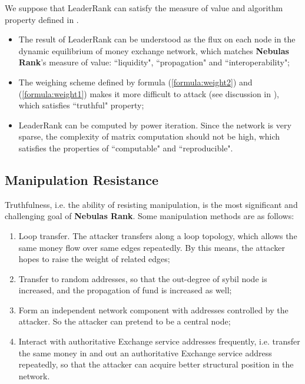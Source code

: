 We suppose that LeaderRank can satisfy the measure of value and algorithm property defined in .
\begin{itemize}
	\item The result of LeaderRank can be understood as the flux on each node in the dynamic equilibrium of money exchange network, which matches \textbf{Nebulas Rank}'s measure of value: ``liquidity", ``propagation" and ``interoperability";
	\item The weighing scheme defined by formula (\ref{formula:weight2}) and (\ref{formula:weight1}) makes it more difficult to attack (see discussion in ), which satisfies ``truthful" property;
	\item LeaderRank can be computed by power iteration. Since the network is very sparse, the complexity of matrix computation should not be high, which satisfies the properties of ``computable" and ``reproducible".
\end{itemize}


\subsection{Manipulation Resistance}\label{subsec:robust}
Truthfulness, i.e. the ability of resisting manipulation, is the most significant and challenging goal of \textbf{Nebulas Rank}. Some manipulation methods are as follows:
\begin{enumerate}
	\item Loop transfer. The attacker transfers along a loop topology, which allows the same money flow over same edges repeatedly. By this means, the attacker hopes to raise the weight of related edges;
	\item Transfer to random addresses, so that the out-degree of sybil node is increased, and the propagation of fund is increased as well;
	\item Form an independent network component with addresses controlled by the attacker. So the attacker can pretend to be a central node;
	\item Interact with authoritative Exchange service addresses frequently, i.e. transfer the same money in and out an authoritative Exchange service address repeatedly, so that the attacker can acquire better structural position in the network.
\end{enumerate}

